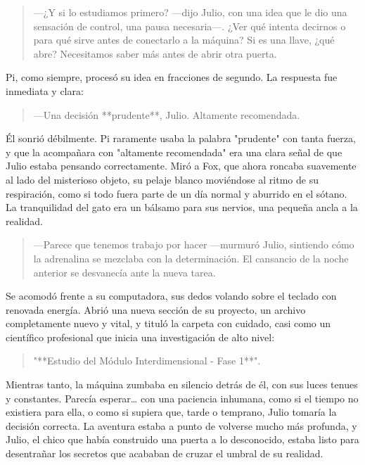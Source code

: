 \documentclass[a4paper,12pt]{book}
\begin{document}
\begin{quote}
    —¿Y si lo estudiamos primero? —dijo Julio, con una idea que le dio una sensación de control, una pausa necesaria—. ¿Ver qué intenta decirnos o para qué sirve antes de conectarlo a la máquina? Si es una llave, ¿qué abre? Necesitamos saber más antes de abrir otra puerta.
\end{quote}

Pi, como siempre, procesó su idea en fracciones de segundo. La respuesta fue inmediata y clara:

\begin{quote}
    —Una decisión **prudente**, Julio. Altamente recomendada.
\end{quote}

Él sonrió débilmente. Pi raramente usaba la palabra "prudente" con tanta fuerza, y que la acompañara con "altamente recomendada" era una clara señal de que Julio estaba pensando correctamente. Miró a Fox, que ahora roncaba suavemente al lado del misterioso objeto, su pelaje blanco moviéndose al ritmo de su respiración, como si todo fuera parte de un día normal y aburrido en el sótano. La tranquilidad del gato era un bálsamo para sus nervios, una pequeña ancla a la realidad.

\begin{quote}
    —Parece que tenemos trabajo por hacer —murmuró Julio, sintiendo cómo la adrenalina se mezclaba con la determinación. El cansancio de la noche anterior se desvanecía ante la nueva tarea.
\end{quote}

Se acomodó frente a su computadora, sus dedos volando sobre el teclado con renovada energía. Abrió una nueva sección de su proyecto, un archivo completamente nuevo y vital, y tituló la carpeta con cuidado, casi como un científico profesional que inicia una investigación de alto nivel:

\begin{quote}
    "**Estudio del Módulo Interdimensional - Fase 1**".
\end{quote}

Mientras tanto, la máquina zumbaba en silencio detrás de él, con sus luces tenues y constantes. Parecía esperar… con una paciencia inhumana, como si el tiempo no existiera para ella, o como si supiera que, tarde o temprano, Julio tomaría la decisión correcta. La aventura estaba a punto de volverse mucho más profunda, y Julio, el chico que había construido una puerta a lo desconocido, estaba listo para desentrañar los secretos que acababan de cruzar el umbral de su realidad.
\end{document}
